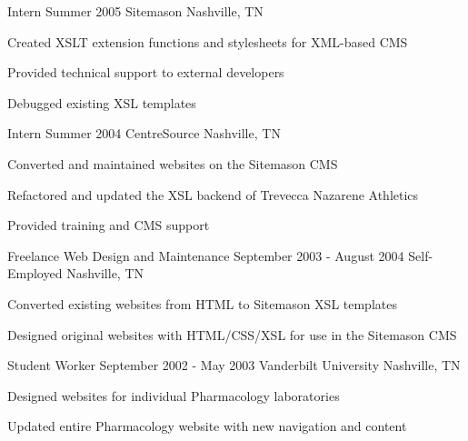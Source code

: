 {\begin{cventries}
  \cventry
  {Intern}
  {Summer 2005}
  {Sitemason}
  {Nashville, TN}
  {
    \begin{cvitems}
      \item Created XSLT extension functions and stylesheets for XML-based CMS
      \item Provided technical support to external developers
      \item Debugged existing XSL templates
    \end{cvitems}
    \cvtags{
      \tagCSS
      \tagHTML
      \tagJavaScript
      \tagXML
      \tagXSLT
    }
  }

  \cventry
  {Intern}
  {Summer 2004}
  {CentreSource}
  {Nashville, TN}
  {
    \begin{cvitems}
      \item Converted and maintained websites on the Sitemason CMS
      \item Refactored and updated the XSL backend of Trevecca Nazarene Athletics
      \item Provided training and CMS support
    \end{cvitems}
    \cvtags{
      \tagCSS
      \tagHTML
      \tagJavaScript
      \tagXML
      \tagXSLT
    }
  }

  \cventry
  {Freelance Web Design and Maintenance}
  {September 2003 - August 2004}
  {Self-Employed}
  {Nashville, TN}
  {
    \begin{cvitems}
      \item Converted existing websites from HTML to Sitemason XSL templates
      \item Designed original websites with HTML/CSS/XSL for use in the Sitemason CMS
    \end{cvitems}
    \cvtags{
      \tagCSS
      \tagHTML
      \tagJavaScript
      \tagXML
      \tagXSLT
      \tagProjectManagement
    }
  }

  \cventry
  {Student Worker}
  {September 2002 - May 2003}
  {Vanderbilt University}
  {Nashville, TN}
  {
    \begin{cvitems}
      \item Designed websites for individual Pharmacology laboratories
      \item Updated entire Pharmacology website with new navigation and content
    \end{cvitems}
    \cvtags{
      \tagCSS
      \tagHTML
      \tagJavaScript
      \tagDreamweaver
      \tagPhotoshop
    }
  }
\end{cventries}
}{}
